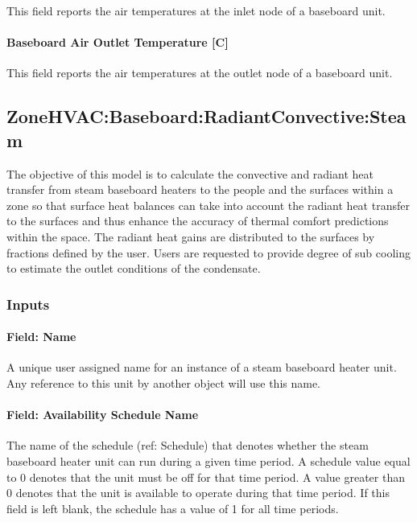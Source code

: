 This field reports the air temperatures at the inlet node of a baseboard unit.

\paragraph{Baseboard Air Outlet Temperature {[}C{]}}\label{baseboard-air-outlet-temperature-c}

This field reports the air temperatures at the outlet node of a baseboard unit.

\subsection{ZoneHVAC:Baseboard:RadiantConvective:Steam}\label{zonehvacbaseboardradiantconvectivesteam}

The objective of this model is to calculate the convective and radiant heat transfer from steam baseboard heaters to the people and the surfaces within a zone so that surface heat balances can take into account the radiant heat transfer to the surfaces and thus enhance the accuracy of thermal comfort predictions within the space. The radiant heat gains are distributed to the surfaces by fractions defined by the user. Users are requested to provide degree of sub cooling to estimate the outlet conditions of the condensate.

\subsubsection{Inputs}\label{inputs-1-035}

\paragraph{Field: Name}\label{field-name-1-034}

A unique user assigned name for an instance of a steam baseboard heater unit. Any reference to this unit by another object will use this name.

\paragraph{Field: Availability Schedule Name}\label{field-availability-schedule-name-1-010}

The name of the schedule (ref: Schedule) that denotes whether the steam baseboard heater unit can run during a given time period. A schedule value equal to 0 denotes that the unit must be off for that time period. A value greater than 0 denotes that the unit is available to operate during that time period. If this field is left blank, the schedule has a value of 1 for all time periods.

